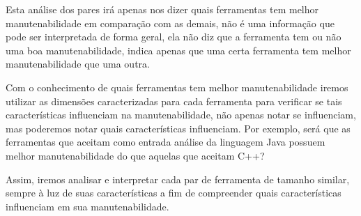 Esta análise dos pares irá apenas nos dizer quais ferramentas tem melhor
manutenabilidade em comparação com as demais, não é uma informação que
pode ser interpretada de forma geral, ela não diz que a ferramenta tem
ou não uma boa manutenabilidade, indica apenas que uma certa ferramenta
tem melhor manutenabilidade que uma outra.

Com o conhecimento de quais ferramentas tem melhor manutenabilidade iremos
utilizar as dimensões caracterizadas para cada ferramenta para verificar se
tais características influenciam na manutenabilidade, não apenas notar se
influenciam, mas poderemos notar quais características influenciam. Por
exemplo, será que as ferramentas que aceitam como entrada análise da linguagem
Java possuem melhor manutenabilidade do que aquelas que aceitam C++?

Assim, iremos analisar e interpretar cada par de ferramenta de tamanho
similar, sempre à luz de suas características a fim de compreender quais
características influenciam em sua manutenabilidade.

